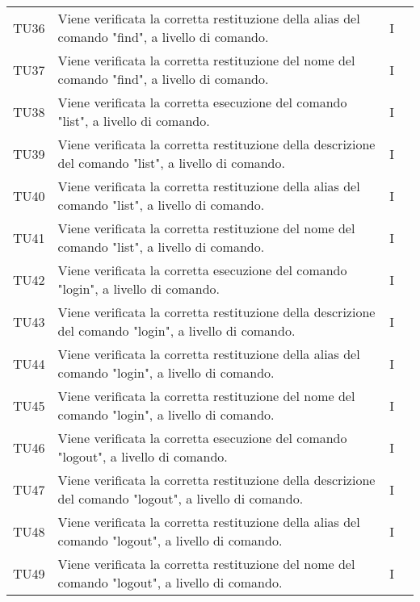 \begin{longtable}{|C{1.5cm}|C{8cm}|C{3cm}|C{1cm}|}
	TU36 &
	Viene verificata la corretta restituzione della alias del comando "find", a livello di comando.  &
	I \\

	TU37 &
	Viene verificata la corretta restituzione del nome del comando "find", a livello di comando.  &
	I \\

	TU38 &
	Viene verificata la corretta esecuzione del comando "list", a livello di comando.  &
	I \\

	TU39 &
	Viene verificata la corretta restituzione della descrizione del comando "list", a livello di comando.  &
	I \\

	TU40 &
	Viene verificata la corretta restituzione della alias del comando "list", a livello di comando.  &
	I \\

	TU41 &
	Viene verificata la corretta restituzione del nome del comando "list", a livello di comando.  &
	I \\

	TU42 &
	Viene verificata la corretta esecuzione del comando "login", a livello di comando.  &
	I \\

	TU43 &
	Viene verificata la corretta restituzione della descrizione del comando "login", a livello di comando.  &
	I \\

	TU44 &
	Viene verificata la corretta restituzione della alias del comando "login", a livello di comando.  &
	I \\

	TU45 &
	Viene verificata la corretta restituzione del nome del comando "login", a livello di comando.  &
	I \\

	TU46 &
	Viene verificata la corretta esecuzione del comando "logout", a livello di comando.  &
	I \\

	TU47 &
	Viene verificata la corretta restituzione della descrizione del comando "logout", a livello di comando.  &
	I \\

	TU48 &
	Viene verificata la corretta restituzione della alias del comando "logout", a livello di comando.  &
	I \\

	TU49 &
	Viene verificata la corretta restituzione del nome del comando "logout", a livello di comando.  &
	I \\


\end{longtable}
